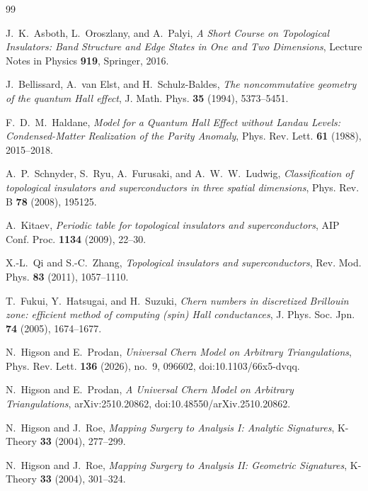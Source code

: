 \documentclass[11pt]{article}
\numberwithin{equation}{section}
\theoremstyle{definition}
\theoremstyle{remark}
\begin{document}
\FloatBarrier

\begin{thebibliography}{99}

J.~K.~Asboth, L.~Oroszlany, and A.~Palyi,
\emph{A Short Course on Topological Insulators: Band Structure and Edge States in One and Two
Dimensions},
Lecture Notes in Physics \textbf{919}, Springer, 2016.

J.~Bellissard, A.~van Elst, and H.~Schulz-Baldes,
\emph{The noncommutative geometry of the quantum Hall effect},
J. Math. Phys. \textbf{35} (1994), 5373--5451.

F.~D.~M.~Haldane,
\emph{Model for a Quantum Hall Effect without Landau Levels: Condensed-Matter Realization of the Parity Anomaly},
Phys. Rev. Lett. \textbf{61} (1988), 2015--2018.

A.~P.~Schnyder, S.~Ryu, A.~Furusaki, and A.~W.~W.~Ludwig,
\emph{Classification of topological insulators and superconductors in three spatial dimensions},
Phys. Rev. B \textbf{78} (2008), 195125.

A.~Kitaev,
\emph{Periodic table for topological insulators and superconductors},
AIP Conf. Proc. \textbf{1134} (2009), 22--30.

X.-L.~Qi and S.-C.~Zhang,
\emph{Topological insulators and superconductors},
Rev. Mod. Phys. \textbf{83} (2011), 1057--1110.

T.~Fukui, Y.~Hatsugai, and H.~Suzuki,
\emph{Chern numbers in discretized Brillouin zone: efficient method of computing (spin) Hall conductances},
J. Phys. Soc. Jpn. \textbf{74} (2005), 1674--1677.

N.~Higson and E.~Prodan,
\emph{Universal Chern Model on Arbitrary Triangulations},
Phys. Rev. Lett. \textbf{136} (2026), no.~9, 096602,
doi:10.1103/66x5-dvqq.

N.~Higson and E.~Prodan,
\emph{A Universal Chern Model on Arbitrary Triangulations},
arXiv:2510.20862, doi:10.48550/arXiv.2510.20862.

N.~Higson and J.~Roe,
\emph{Mapping Surgery to Analysis I: Analytic Signatures},
K-Theory \textbf{33} (2004), 277--299.

N.~Higson and J.~Roe,
\emph{Mapping Surgery to Analysis II: Geometric Signatures},
K-Theory \textbf{33} (2004), 301--324.


\end{thebibliography}
\end{document}
